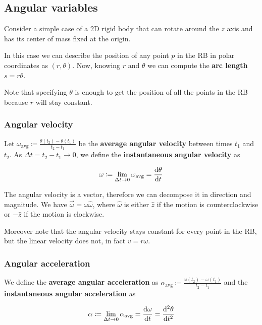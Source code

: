 \documentclass[14pt]{extarticle}
\begin{document}
\subsection{Angular variables}

Consider a simple case of a 2D rigid body that can rotate around the $z$ axis and has its center of mass fixed at the origin.

In this case we can describe the position of any point $p$ in the RB in polar coordinates as $(r, \theta)$. Now, knowing $r$ and $\theta$ we can compute the \textbf{arc length} $s = r\theta$.

Note that specifying $\theta$ is enough to get the position of all the points in the RB because $r$ will stay constant.

\subsubsection{Angular velocity}

Let $\omega_{\text{avg}} \coloneq \frac{\theta(t_2) - \theta(t_1)}{t_2 - t_1}$ be the \textbf{average angular velocity} between times $t_1$ and $t_2$. As $\Delta t = t_2 - t_1 \to 0$, we define the \textbf{instantaneous angular velocity} as

\begin{equation}
    \omega \coloneq \lim_{\Delta t \to 0} \omega_{\text{avg}} = \dv{\theta}{t}
\end{equation}

The angular velocity is a vector, therefore we can decompose it in direction and magnitude. We have $\vec{\omega} = \omega \hat{\omega}$, where $\hat{\omega}$ is either $\hat{z}$ if the motion is counterclockwise or $-\hat{z}$ if the motion is clockwise.

Moreover note that the angular velocity stays constant for every point in the RB, but the linear velocity does not, in fact $v = r\omega$.

\subsubsection{Angular acceleration}

We define the \textbf{average angular acceleration} as $\alpha_{\text{avg}} \coloneq \frac{\omega(t_2) - \omega(t_1)}{t_2 - t_1}$ and the \textbf{instantaneous angular acceleration} as

\begin{equation}
    \alpha \coloneq \lim_{\Delta t \to 0} \alpha_{\text{avg}} = \dv{\omega}{t} = \dv[2]{\theta}{t}
\end{equation}
\end{document}
